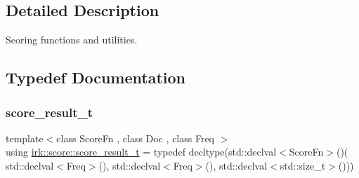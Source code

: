\subsection{Detailed Description}
Scoring functions and utilities. 

\subsection{Typedef Documentation}
\mbox{\label{namespaceirk_1_1score_af4a2c84b3548a4ac12aac3862bc94875}} 
\subsubsection{\texorpdfstring{score\+\_\+result\+\_\+t}{score\_result\_t}}
{\footnotesize\ttfamily template$<$class Score\+Fn , class Doc , class Freq $>$ \\
using \mbox{\hyperlink{namespaceirk_1_1score_af4a2c84b3548a4ac12aac3862bc94875}{irk\+::score\+::score\+\_\+result\+\_\+t}} = typedef decltype(std\+::declval$<$Score\+Fn$>$()( std\+::declval$<$Freq$>$(), std\+::declval$<$Freq$>$(), std\+::declval$<$std\+::size\+\_\+t$>$()))}

